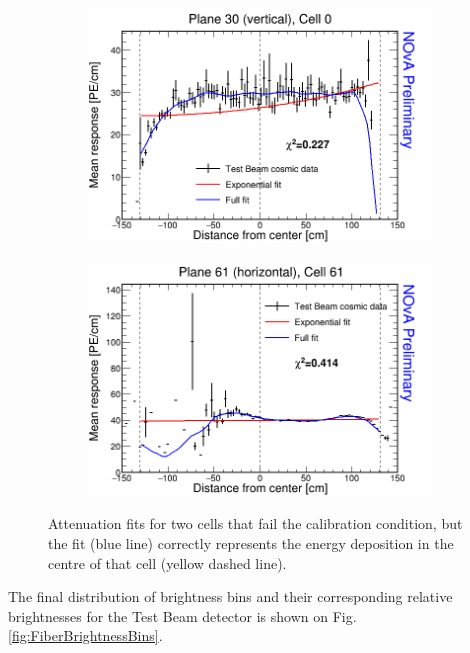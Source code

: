 \begin{figure}[h]
\centering
\begin{subfigure}[b]{0.495\textwidth}
\centering
\includegraphics[width=\textwidth]{PlotsTBCalibTechnote/ExampleForBrightFile_fb0_030_000.png}
\end{subfigure}
\begin{subfigure}[b]{0.495\textwidth}
\centering
\includegraphics[width=\textwidth]{PlotsTBCalibTechnote/ExampleForBrightFile_fb5_061_061.png}
\end{subfigure}
\caption{Attenuation fits for two cells that fail the calibration condition, but the fit (blue line) correctly represents the energy deposition in the centre of that cell (yellow dashed line).}
\label{fig:FiberBrightnessExamples}
\end{figure}

The final distribution of brightness bins and their corresponding relative brightnesses for the Test Beam detector is shown on Fig. \ref{fig:FiberBrightnessBins}.

